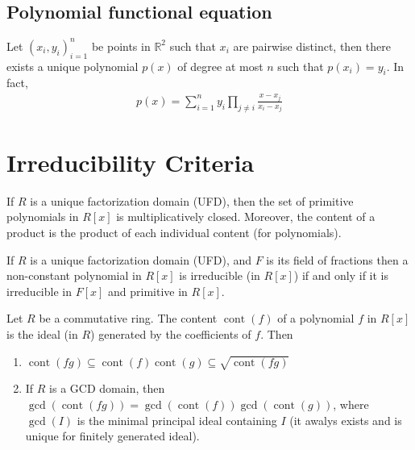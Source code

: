 \documentclass{treatise}
\begin{document}
\begin{shaded}
\subsection{Polynomial functional equation}
\begin{theorem}
Let $(x_i, y_i)_{i = 1}^n$ be points in $\mathbb{R}^2$ such that $x_i$ are pairwise distinct, then there exists a unique polynomial $p(x)$ of degree at most $n$ such that $p(x_i) = y_i$. In fact,
\begin{align*}
	p(x) = \sum_{i = 1}^n y_i \prod_{j \neq i} \frac{x - x_j}{x_i - x_j}
\end{align*}
\end{theorem}

\section{Irreducibility Criteria}
\begin{lemma}
If $R$ is a unique factorization domain (UFD), then the set of primitive polynomials in $R[x]$ is multiplicatively closed. Moreover, the content of a product is the product of each individual content (for polynomials).
\end{lemma}
\begin{corollary}
If $R$ is a unique factorization domain (UFD), and $F$ is its field of fractions then a non-constant polynomial in $R[x]$ is irreducible (in $R[x]$) if and only if it is irreducible in $F[x]$ and primitive in $R[x]$.
\end{corollary}
\begin{theorem}
Let $R$ be a commutative ring. The content $\operatorname{cont}(f)$ of a polynomial $f$ in $R[x]$ is the ideal (in $R$) generated by the coefficients of $f$. Then
\begin{enumerate}
	\item $\operatorname{cont}(fg) \subseteq \operatorname{cont}(f) \operatorname{cont}(g) \subseteq \sqrt{\operatorname{cont}(fg)}$
	\item If $R$ is a GCD domain, then $\gcd (\operatorname{cont}(fg)) = \gcd (\operatorname{cont}(f)) \gcd (\operatorname{cont}(g))$, where $\gcd(I)$ is the minimal principal ideal containing $I$ (it awalys exists and is unique for finitely generated ideal).
\end{enumerate}
\end{theorem}
\begin{theorem}

\end{theorem}
\end{shaded}
\end{document}
